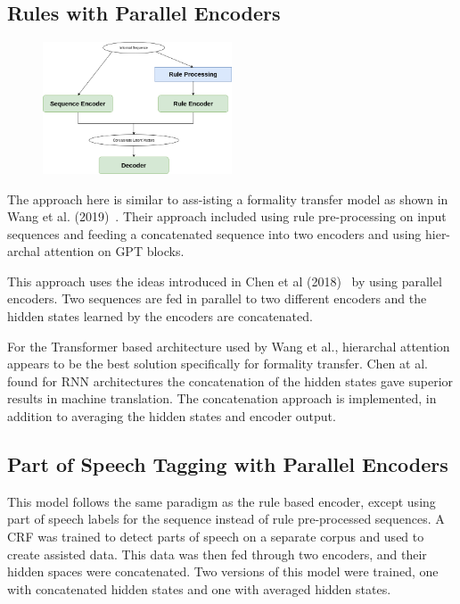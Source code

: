 \documentclass[12pt]{article}
\begin{document}
\subsection{Rules with Parallel Encoders}
\begin{figure}
    \centering
    \includegraphics[width=0.5\textwidth]{Rule Concat.png}
\end{figure}
The approach here is similar to ass-isting a formality transfer model
as shown in Wang et al. (2019)~\cite{rule-harnessing}.
Their approach included using rule pre-processing on input sequences and feeding 
a concatenated sequence into two encoders and using hier-archal attention on GPT blocks. \par 
This approach uses the ideas introduced in Chen et al (2018)~\cite{parallelencoders}
by using parallel encoders. Two sequences are fed in parallel to two different
encoders and the hidden states learned by the encoders are concatenated.  \par
For the Transformer
based architecture used by Wang et al.,  hierarchal attention appears to be the best solution
specifically for formality transfer. Chen at al. found for RNN architectures the concatenation 
of the hidden states gave superior results in machine translation. The concatenation approach
is implemented, in addition to averaging the hidden states and encoder output.  

\subsection{Part of Speech Tagging with Parallel Encoders}
This model follows the same paradigm as the rule based encoder, except using part of 
speech labels for the sequence instead of rule pre-processed sequences. A CRF was trained 
to detect parts of speech on a separate corpus and used 
to create assisted data. This data was then fed through two encoders, and their hidden spaces
were concatenated. Two versions of this model were trained, one with concatenated hidden 
states and one with averaged hidden states. 
\end{document}
